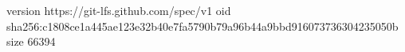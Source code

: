 version https://git-lfs.github.com/spec/v1
oid sha256:c1808ce1a445ae123e32b40e7fa5790b79a96b44a9bbd916073736304235050b
size 66394
